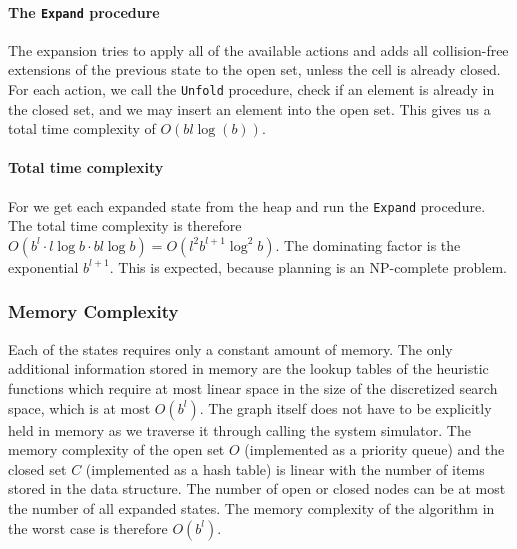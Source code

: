 \paragraph{The \texttt{Expand} procedure}
The expansion tries to apply all of the available actions and adds all collision-free extensions of the previous state to the open set, unless the cell is already closed. For each action, we call the \texttt{Unfold} procedure, check if an element is already in the closed set, and we may insert an element into the open set. This gives us a total time complexity of $O(bl \log(b))$.

\paragraph{Total time complexity} For we get each expanded state from the heap and run the \texttt{Expand} procedure. The total time complexity is therefore $O(b^l \cdot l\log b \cdot bl \log b)=O(l^{2}b^{l+1}\log^2 b)$. The dominating factor is the exponential $b^{l+1}$. This is expected, because planning is an NP-complete problem. 

\subsubsection{Memory Complexity}

Each of the states requires only a constant amount of memory. The only additional information stored in memory are the lookup tables of the heuristic functions which require at most linear space in the size of the discretized search space, which is at most $O(b^l)$. The graph itself does not have to be explicitly held in memory as we traverse it through calling the system simulator. The memory complexity of the open set $O$ (implemented as a priority queue) and the closed set $C$ (implemented as a hash table) is linear with the number of items stored in the data structure. The number of open or closed nodes can be at most the number of all expanded states. The memory complexity of the algorithm in the worst case is therefore $O(b^l)$.
